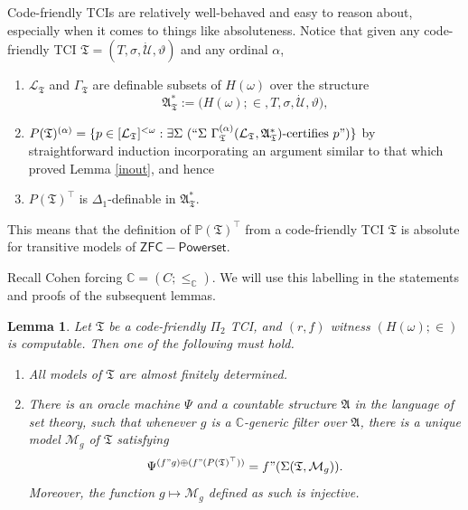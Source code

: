 \documentclass[12pt, twoside]{memoir}
\numberwithin{equation}{section}
\newtheorem{lem}[thm]{Lemma}
\theoremstyle{definition}
\theoremstyle{remark}
\theoremstyle{definition}
\theoremstyle{definition}
\theoremstyle{definition}
\theoremstyle{remark}
\begin{document}
Code-friendly TCIs are relatively well-behaved and easy to reason about, especially when it comes to things like absoluteness. Notice that given any code-friendly TCI $\mathfrak{T} = (T, \sigma, \dot{\mathcal{U}}, \vartheta)$ and any ordinal $\alpha$,
\begin{enumerate}[leftmargin=40pt, label=(CF\arabic*)]
    \item\label{cf1} $\mathcal{L}_{\mathfrak{T}}$ and $\Gamma_{\mathfrak{T}}$ are definable subsets of $H(\omega)$ over the structure $$\mathfrak{A}^*_{\mathfrak{T}} := \mathfrak(H(\omega); \in, T, \sigma, \dot{\mathcal{U}}, \vartheta),$$
    \item $P(\mathfrak{T})^{(\alpha)} = \{p \in [\mathcal{L}_{\mathfrak{T}}]^{< \omega} : \exists \Sigma \ (``\Sigma \ \Gamma_{\mathfrak{T}}^{(\alpha)} (\mathcal{L}_{\mathfrak{T}}, \mathfrak{A}^*_{\mathfrak{T}})\text{-certifies } p")\}$ by straightforward induction incorporating an argument similar to that which proved Lemma \ref{inout}, and hence
    \item $P(\mathfrak{T})^{\top}$ is $\Delta_1$-definable in $\mathfrak{A}^*_{\mathfrak{T}}$.
\end{enumerate}
This means that the definition of $\mathbb{P}(\mathfrak{T})^{\top}$ from a code-friendly TCI $\mathfrak{T}$ is absolute for transitive models of $\mathsf{ZFC - Powerset}$.

Recall Cohen forcing $\mathbb{C} = (C; \leq_{\mathbb{C}})$. We will use this labelling in the statements and proofs of the subsequent lemmas.

\begin{lem}\label{ctblegeneric}
Let $\mathfrak{T}$ be a code-friendly $\Pi_2$ TCI, and $(r, f)$ witness $(H(\omega); \in)$ is computable. Then one of the following must hold.
\begin{enumerate}[label=(\arabic*)]
    \item All models of $\mathfrak{T}$ are almost finitely determined.
    \item\label{3782} There is an oracle machine $\Psi$ and a countable structure $\mathfrak{A}$ in the language of set theory, such that whenever $g$ is a $\mathbb{C}$-generic filter over $\mathfrak{A}$, there is a unique model $\mathcal{M}_g$ of $\mathfrak{T}$ satisfying 
    \begin{equation*}
        \Psi^{(f" g) \oplus (f" (P(\mathfrak{T})^{\top}))} = f" (\Sigma(\mathfrak{T}, \mathcal{M}_g)) \text{.}
    \end{equation*}
    Moreover, the function $g \mapsto \mathcal{M}_g$ defined as such is injective.
\end{enumerate}
\end{lem}
\end{document}
